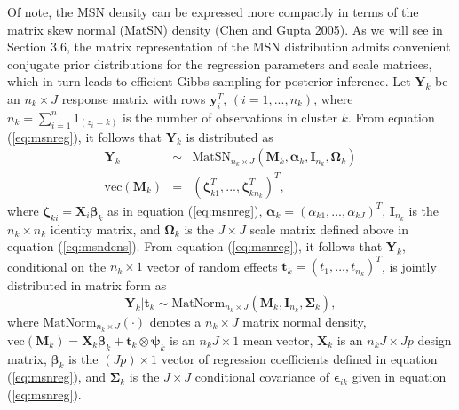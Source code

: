 \documentclass[useAMS,referee]{biom}
\begin{document}
Of note, the MSN density can be expressed more compactly in terms of the matrix skew normal (MatSN) density (Chen and Gupta 2005). As we will see in Section 3.6, the matrix representation of the MSN distribution admits convenient conjugate prior distributions for the regression parameters and scale matrices, which in turn leads to efficient Gibbs sampling for posterior inference. Let $\mathbf{Y}_k$ be an ${n_k \times J}$ response matrix with rows $\mathbf{y}_i^T$, $(i = 1,...,n_k)$, where $n_k = \sum_{i = 1}^n {1}_{(z_i = k)}$ is the number of observations in cluster $k$. From equation (\ref{eq:msnreg}), it follows that $\mathbf{Y}_k$ is distributed as
\begin{eqnarray*}
\mathbf{Y}_{k} &\sim& \text{MatSN}_{n_k \times J}(\mathbf{M}_k,\boldsymbol\alpha_k,\mathbf{I}_{n_k},\boldsymbol\Omega_k)\\
\text{vec}(\mathbf{M}_k) &=& (\boldsymbol\zeta_{k1}^T,...,\boldsymbol\zeta_{kn_k}^T)^T,
\end{eqnarray*}
where $\boldsymbol\zeta_{ki} = \mathbf{X}_i \boldsymbol\beta_k$ as in equation (\ref{eq:msnreg}), $\boldsymbol\alpha_k = (\alpha_{k1},...,\alpha_{kJ})^T$, $\mathbf{I}_{n_k}$ is the $n_k\times n_k$ identity matrix, and $\boldsymbol\Omega_k$ is the $J\times J$ scale matrix defined above in equation (\ref{eq:msndens}). From equation (\ref{eq:msnreg}), it follows that $\mathbf{Y}_{k}$, conditional on the $n_k\times 1$ vector of random effects $\mathbf{t}_{k} = (t_1,...,t_{n_k})^T$, is jointly distributed in matrix form as
\[
\mathbf{Y}_k | \mathbf{t}_k \sim \text{MatNorm}_{n_k \times J}(\mathbf{M}_k, \mathbf{I}_{n_k}, \boldsymbol\Sigma_k),
\]
where $\text{MatNorm}_{n_k \times J}(\cdot)$ denotes a $n_k\times J$ matrix normal density, $\text{vec}(\mathbf{M}_k) = \mathbf{X}_{k} \boldsymbol\beta_k + \mathbf{t}_k \otimes \boldsymbol\psi_k$ is an $n_kJ\times 1$ mean vector, $\mathbf{X}_k$ is an $n_kJ \times Jp$ design matrix, $\boldsymbol\beta_k$ is the $(Jp)\times 1$ vector of regression coefficients defined in equation (\ref{eq:msnreg}), and $\boldsymbol\Sigma_k$ is the $J\times J$ conditional covariance of $\boldsymbol\epsilon_{ik}$ given in equation (\ref{eq:msnreg}).
\end{document}
